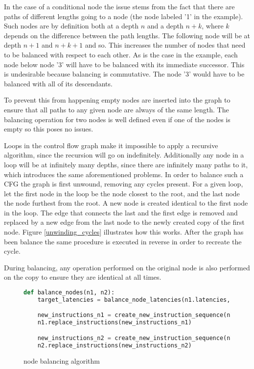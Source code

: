 \documentclass{article}
\begin{document}
In the case of a conditional node the issue stems from the fact that there are paths of different lengths going to a node (the node labeled '1' in the example). Such nodes are by definition both at a depth $n$ and 
a depth $n+k$, where $k$ depends on the difference between the path lengths. The following node will be at depth $n+1$ and $n+k+1$ and so. This increases the number of nodes that need to be balanced with respect to each other.
As is the case in the example, each node below node '3' will have to be balanced with its immediate successor. This is undesirable because balancing is commutative. The node '3' would have to be balanced with all of its descendants.

To prevent this from happening empty nodes are inserted into the graph to ensure that all paths to any given node are always of the same length. The balancing operation for two nodes is well 
defined even if one of the nodes is empty so this poses no issues. 

Loops in the control flow graph make it impossible to apply a recursive algorithm, since the recursion will go on indefinitely. Additionally any node in a loop will be at infinitely many depths, since there are infinitely many paths to it,
which introduces the same aforementioned problems. In order to balance such a CFG the graph is first unwound, removing any cycles present. 
For a given loop, let the first node in the loop be the node closest to the root, and the last node the node furthest from the root. A new node is created identical to the first node in the loop. 
The edge that connects the last and the first edge is removed and replaced by a new edge from the last node to the newly created copy of the first node. Figure \ref{unwinding_cycles} illustrates how this works. 
After the graph has been balance the same procedure is executed in reverse in order to recreate the cycle. 

During balancing, any operation performed on the original node is also performed on the copy to ensure they are identical at all times.


\begin{figure}
	\begin{lstlisting}[language=Python]
	def balance_nodes(n1, n2):
    target_latencies = balance_node_latencies(n1.latencies, n2.latencies)

    new_instructions_n1 = create_new_instruction_sequence(n1.instructions, target_latencies)
    n1.replace_instructions(new_instructions_n1)

    new_instructions_n2 = create_new_instruction_sequence(n1.instructions, target_latencies)
    n2.replace_instructions(new_instructions_n2)
\end{lstlisting}
\caption{node balancing algorithm}
\label{node_balancing}
\end{figure}
\end{document}
